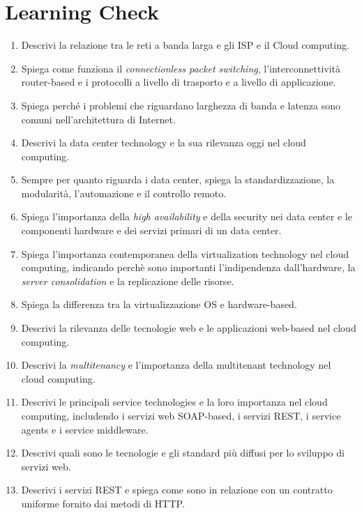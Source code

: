 \section{Learning Check}
\begin{enumerate}
    \item Descrivi la relazione tra le reti a banda larga e gli ISP e il Cloud computing.
    \item Spiega come funziona il \textit{connectionless packet switching}, l'interconnettività router-based e i protocolli a livello di trasporto e a livello di applicazione.
    \item Spiega perché i problemi che riguardano larghezza di banda e latenza sono comuni nell'architettura di Internet.
    \item Descrivi la data center technology e la sua rilevanza oggi nel cloud computing.
    \item Sempre per quanto riguarda i data center, spiega la standardizzazione, la modularità, l'automazione e il controllo remoto.
    \item Spiega l'importanza della \textit{high availability} e della security nei data center e le componenti hardware e dei servizi primari di un data center.
    \item Spiega l'importanza contemporanea della virtualization technology nel cloud computing, indicando perchè sono importanti l'indipendenza dall'hardware, la \textit{server consolidation} e la replicazione delle risorse.
    \item Spiega la differenza tra la virtualizzazione OS e hardware-based.
    \item Descrivi la rilevanza delle tecnologie web e le applicazioni web-based nel cloud computing.
    \item Descrivi la \textit{multitenancy} e l'importanza della multitenant technology nel cloud computing.
    \item Descrivi le principali service technologies e la loro importanza nel cloud computing, includendo i servizi web SOAP-based, i servizi REST, i service agents e i service middleware.
    \item Descrivi quali sono le tecnologie e gli standard più diffusi per lo sviluppo di servizi web.
    \item Descrivi i servizi REST e spiega come sono in relazione con un contratto uniforme fornito dai metodi di HTTP.
\end{enumerate}

